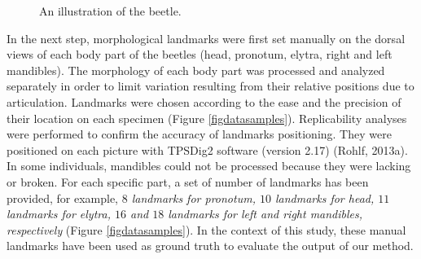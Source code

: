\documentclass[review]{elsarticle}
\begin{document}
\begin{figure}[h!]
	\centering
	\caption{An illustration of the beetle.}
	\label{imgbeetle}
\end{figure}

In the next step, morphological landmarks were first set manually on the dorsal views of each body part of the beetles (head, pronotum, elytra, right and left mandibles). The morphology of each body part was processed and analyzed separately in order to limit variation resulting from their relative positions due to articulation. Landmarks were chosen according to the ease and the precision of their location on each specimen (Figure \ref{figdatasamples}). Replicability analyses were performed to confirm the accuracy of landmarks positioning. They were positioned on each picture with TPSDig2 software (version 2.17) (Rohlf, 2013a). In some individuals, mandibles could not be processed because they were lacking or broken. For each specific part, a set of number of landmarks has been provided, for example, \textit{$8$ landmarks for pronotum, $10$ landmarks for head, $11$ landmarks for elytra, $16$ and $18$ landmarks for left and right mandibles, respectively} (Figure \ref{figdatasamples}). In the context of this study, these manual landmarks have been used as ground truth to evaluate the output of our method.
\end{document}
